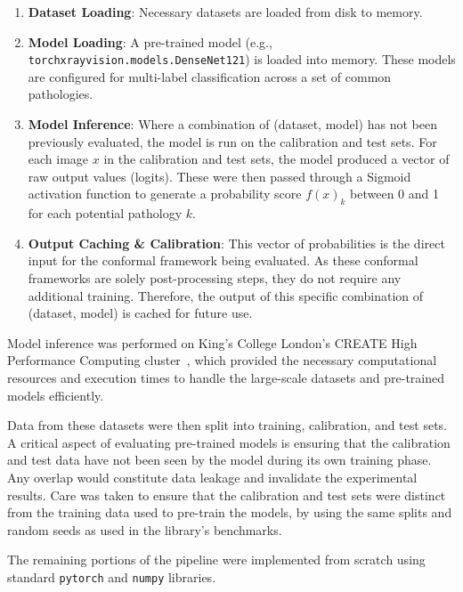 \begin{enumerate}
    \item \textbf{Dataset Loading}:
    Necessary datasets are loaded from disk to memory.

    \item \textbf{Model Loading}:
    A pre-trained model (e.g., \texttt{torchxrayvision.models.DenseNet121}) is loaded into memory.
    These models are configured for multi-label classification across a set of common pathologies.

    \item \textbf{Model Inference}:
    Where a combination of (dataset, model) has not been previously evaluated,
    the model is run on the calibration and test sets.
    For each image \(x\) in the calibration and test sets,
    the model produced a vector of raw output values (logits).
    These were then passed through a Sigmoid activation function to generate a probability score
    \(f(x)_k\) between 0 and 1 for each potential pathology \(k\).

    \item \textbf{Output Caching \& Calibration}:
    This vector of probabilities is the direct input for the conformal framework being evaluated.
    As these conformal frameworks are solely post-processing steps,
    they do not require any additional training.
    Therefore, the output of this specific combination of (dataset, model) is cached for future use.
\end{enumerate}

Model inference was performed on King's College London's
CREATE High Performance Computing cluster~\cite{kcl2025create},
which provided the necessary computational resources and execution times
to handle the large-scale datasets and pre-trained models efficiently.

Data from these datasets were then split into training, calibration, and test sets.
A critical aspect of evaluating pre-trained models is ensuring that the calibration and test data
have not been seen by the model during its own training phase.
Any overlap would constitute data leakage and invalidate the experimental results.
Care was taken to ensure that the calibration and test sets were distinct
from the training data used to pre-train the models,
by using the same splits and random seeds as used in the library's benchmarks.

The remaining portions of the pipeline were implemented from scratch using
standard \texttt{pytorch} and \texttt{numpy} libraries.

